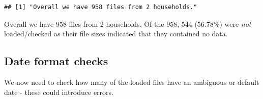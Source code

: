 \documentclass[]{article}
\newenvironment{Shaded}{\begin{snugshade}}{\end{snugshade}}
\newcommand{\KeywordTok}[1]{\textcolor[rgb]{0.13,0.29,0.53}{\textbf{#1}}}
\newcommand{\StringTok}[1]{\textcolor[rgb]{0.31,0.60,0.02}{#1}}
\newcommand{\CommentTok}[1]{\textcolor[rgb]{0.56,0.35,0.01}{\textit{#1}}}
\newcommand{\OperatorTok}[1]{\textcolor[rgb]{0.81,0.36,0.00}{\textbf{#1}}}
\newcommand{\NormalTok}[1]{#1}
\begin{document}
\begin{Shaded}
\end{Shaded}

\begin{verbatim}
## [1] "Overall we have 958 files from 2 households."
\end{verbatim}

\begin{Shaded}
\end{Shaded}

Overall we have 958 files from 2 households. Of the 958, 544 (56.78\%)
were \emph{not} loaded/checked as their file sizes indicated that they
contained no data.

\subsection{Date format checks}\label{date-format-checks}

We now need to check how many of the loaded files have an ambiguous or
default date - these could introduce errors.
\end{document}
